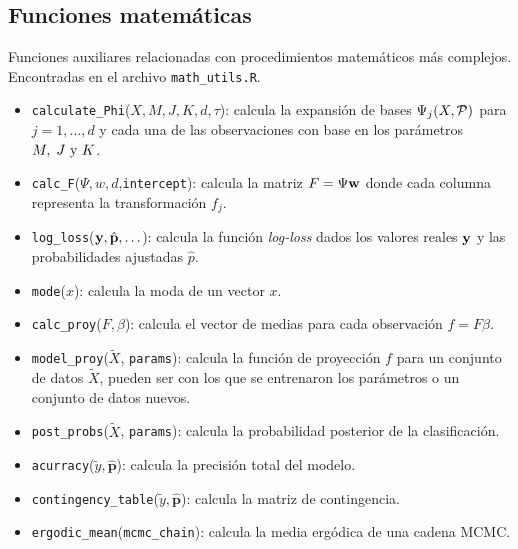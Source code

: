 \documentclass[../../Main/Main.tex]{subfiles}
\begin{document}
\subsection*{Funciones matemáticas}
Funciones auxiliares relacionadas con procedimientos matemáticos más complejos. Encontradas en el archivo \verb|math_utils.R|.
\begin{itemize}[label = {}]
	\item \verb|calculate_Phi|($X,M,J,K,d,\tau$): calcula la expansión de bases $\Psi_j(X,\P)$ para $j = 1,\ldots,d$ y cada una de las observaciones con base en los parámetros $\MJK$.
	\item \verb|calc_F|($\Psi,w,d$,\verb|intercept|): calcula la matriz $F = \Psi \wsn$ donde cada columna representa la transformación $f_j$.
	\item \verb|log_loss|($\ysn,\hat{\mathbf{p}},\ldots $): calcula la función \textit{log-loss} dados los valores reales $\ysn$ y las probabilidades ajustadas $\hat{p}$.
	\item \verb|mode|($x$): calcula la moda de un vector $x$.
	\item \verb|calc_proy|($F,\beta$): calcula el vector de medias para cada observación $f=F\beta$.
	\item \verb|model_proy|($\tilde{X}$, \verb|params|): calcula la función de proyección $f$ para un conjunto de datos $\tilde{X}$, pueden ser con los que se entrenaron los parámetros o un conjunto de datos nuevos.
	\item \verb|post_probs|($\tilde{X}$, \verb|params|): calcula la probabilidad posterior de la clasificación. 
	\item \verb|acurracy|($\tilde{y},\hat{\mathbf{p}}$): calcula la precisión total del modelo.
	\item \verb|contingency_table|($\tilde{y},\hat{\mathbf{p}}$): calcula la matriz de contingencia.
	\item \verb|ergodic_mean|(\verb|mcmc_chain|): calcula la media ergódica de una cadena MCMC.
\end{itemize}
\end{document}
